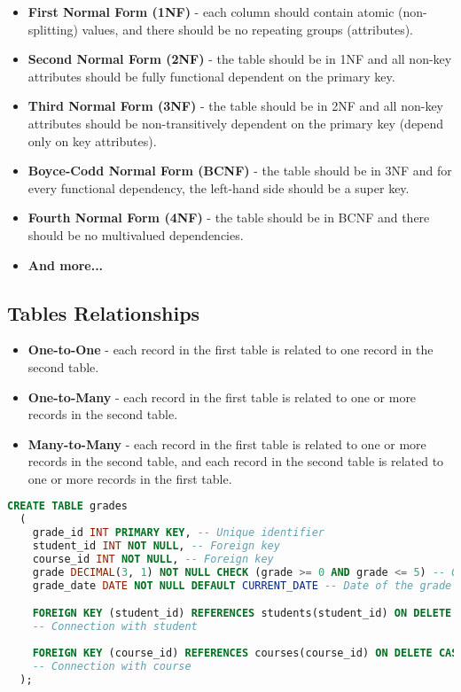 \documentclass{article}
\begin{document}
\begin{itemize}
  \item \textbf{First Normal Form (1NF)} - each column should contain atomic (non-splitting) values, and there should be no repeating groups (attributes).
  \item \textbf{Second Normal Form (2NF)} - the table should be in 1NF and all non-key attributes should be fully functional dependent on the primary key.
  \item \textbf{Third Normal Form (3NF)} - the table should be in 2NF and all non-key attributes should be non-transitively dependent on the primary key (depend only on key attributes).
  \item \textbf{Boyce-Codd Normal Form (BCNF)} - the table should be in 3NF and for every functional dependency, the left-hand side should be a super key.
  \item \textbf{Fourth Normal Form (4NF)} - the table should be in BCNF and there should be no multivalued dependencies.
  \item \textbf{And more...} 
\end{itemize}

\subsection{Tables Relationships}
\noindent

\begin{itemize}
  \item \textbf{One-to-One} - each record in the first table is related to one record in the second table. 
  \item \textbf{One-to-Many} - each record in the first table is related to one or more records in the second table.
  \item \textbf{Many-to-Many} - each record in the first table is related to one or more records in the second table, and each record in the second table is related to one or more records in the first table.
\end{itemize}

\begin{lstlisting}[language=SQL, caption={Creating tables in SQL}]
  CREATE TABLE grades
  (
    grade_id INT PRIMARY KEY, -- Unique identifier
    student_id INT NOT NULL, -- Foreign key
    course_id INT NOT NULL, -- Foreign key
    grade DECIMAL(3, 1) NOT NULL CHECK (grade >= 0 AND grade <= 5) -- Grade value from 0 to 5
    grade_date DATE NOT NULL DEFAULT CURRENT_DATE -- Date of the grade

    FOREIGN KEY (student_id) REFERENCES students(student_id) ON DELETE CASCADE,
    -- Connection with student
    
    FOREIGN KEY (course_id) REFERENCES courses(course_id) ON DELETE CASCADE
    -- Connection with course
  );
\end{lstlisting}
\end{document}
